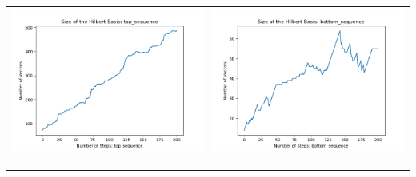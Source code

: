\documentclass[10pt]{article}
\begin{document}
\begin{tabular}{c|c}
\begin{minipage}{.45\textwidth}
\includegraphics[width=\textwidth]{"DATA/5d/6 generators 2 bound E/top_sequence SIZE"}
\end{minipage} &
\begin{minipage}{.45\textwidth}
\includegraphics[width=\textwidth]{"DATA/5d/6 generators 2 bound E bottomup/bottom_sequence SIZE"}
\end{minipage} \\ \\
\hline \\\begin{minipage}{.45\textwidth}

\end{minipage}
\end{tabular}
\end{document}
